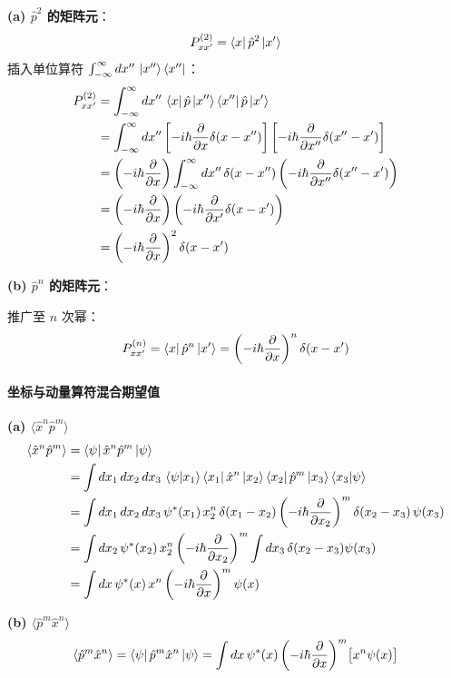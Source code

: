 \documentclass[12pt,a4paper]{article}
\begin{document}
\textbf{(a) $\hat{p}^2$ 的矩阵元}：
\[
P_{xx'}^{(2)}=\bra{x}\hat{p}^2\ket{x'}
\]
插入单位算符 $\int_{-\infty}^{\infty}dx''\,\ket{x''}\bra{x''}$：
\begin{align*}
P_{xx'}^{(2)}&=\int_{-\infty}^{\infty}dx''\,\bra{x}\hat{p}\ket{x''}\bra{x''}\hat{p}\ket{x'}\\
&=\int_{-\infty}^{\infty}dx''\left[-i\hbar\frac{\partial}{\partial x}\delta(x-x'')\right]\left[-i\hbar\frac{\partial}{\partial x''}\delta(x''-x')\right]\\
&=\left(-i\hbar\frac{\partial}{\partial x}\right)\int_{-\infty}^{\infty}dx''\,\delta(x-x'')\left(-i\hbar\frac{\partial}{\partial x''}\delta(x''-x')\right)\\
&=\left(-i\hbar\frac{\partial}{\partial x}\right)\left(-i\hbar\frac{\partial}{\partial x'}\delta(x-x')\right)\\
&=\left(-i\hbar\frac{\partial}{\partial x}\right)^2\delta(x-x')
\end{align*}

\textbf{(b) $\hat{p}^n$ 的矩阵元}：

推广至 $n$ 次幂：
\[
P_{xx'}^{(n)}=\bra{x}\hat{p}^n\ket{x'}=\left(-i\hbar\frac{\partial}{\partial x}\right)^n\delta(x-x')
\]

\paragraph{坐标与动量算符混合期望值}

\textbf{(a) $\langle\hat{x}^n\hat{p}^m\rangle$}
\begin{align*}
\langle\hat{x}^n\hat{p}^m\rangle&=\bra{\psi}\hat{x}^n\hat{p}^m\ket{\psi}\\
&=\int dx_1\,dx_2\,dx_3\,\braket{\psi|x_1}\bra{x_1}\hat{x}^n\ket{x_2}\bra{x_2}\hat{p}^m\ket{x_3}\braket{x_3|\psi}\\
&=\int dx_1\,dx_2\,dx_3\,\psi^*(x_1)\,x_2^n\,\delta(x_1-x_2)\left(-i\hbar\frac{\partial}{\partial x_2}\right)^m\delta(x_2-x_3)\,\psi(x_3)\\
&=\int dx_2\,\psi^*(x_2)\,x_2^n\left(-i\hbar\frac{\partial}{\partial x_2}\right)^m\int dx_3\,\delta(x_2-x_3)\psi(x_3)\\
&=\int dx\,\psi^*(x)\,x^n\left(-i\hbar\frac{\partial}{\partial x}\right)^m\psi(x)
\end{align*}

\textbf{(b) $\langle\hat{p}^m\hat{x}^n\rangle$}
\[
\langle\hat{p}^m\hat{x}^n\rangle=\bra{\psi}\hat{p}^m\hat{x}^n\ket{\psi}=\int dx\,\psi^*(x)\left(-i\hbar\frac{\partial}{\partial x}\right)^m\!\big[x^n\psi(x)\big]
\]
\end{document}
